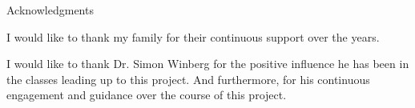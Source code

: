 \begin{centerpage}{Acknowledgments}

I would like to thank my family for their continuous support over the years.

I would like to thank Dr. Simon Winberg for the positive influence he has been in
    the classes leading up to this project. And furthermore, for his continuous
    engagement and guidance over the course of this project. 

\end{centerpage}
